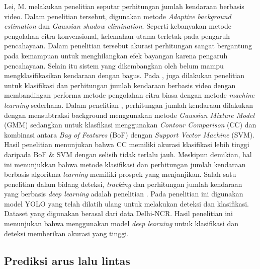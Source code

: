 \documentclass[conference]{IEEEtran}
\begin{document}
Lei, M. melakukan penelitian seputar perhitungan jumlah kendaraan berbasis video. Dalam penelitian tersebut, digunakan metode \textit{Adaptive background estimation} dan \textit{Gaussian shadow elimination}. Seperti kebanyakan metode pengolahan citra konvensional, kelemahan utama terletak pada pengaruh pencahayaan. Dalam penelitian tersebut akurasi perhitungan
sangat bergantung pada kemampuan untuk menghilangkan efek bayangan karena pengaruh pencahayaan. Selain itu sistem yang dikembangkan oleh \cite{Lei2018VehicleCounting} belum mampu mengklasifikasikan kendaraan dengan bagus.
Pada \cite{Sheeraz2018VehicleDetection}, juga dilakukan penelitian untuk klasifikasi dan perhitungan jumlah kendaraan berbasis video dengan membandingan performa metode pengolahan citra biasa dengan metode \textit{machine learning} sederhana. Dalam penelitian \cite{Sheeraz2018VehicleDetection}, perhitungan jumlah kendaraan dilakukan dengan mensubtraksi background menggunakan metode \textit{Gaussian Mixture Model} (GMM) sedangkan untuk klasfikasi menggunakan \textit{Contour Comparison} (CC) dan kombinasi antara \textit{Bag of Features}
(BoF) dengan \textit{Support Vector Machine} (SVM). Hasil penelitian menunjukan bahwa CC memiliki akurasi klasifikasi lebih tinggi daripada BoF \& SVM dengan selisih tidak terlalu jauh. 
Meskipun demikian, hal ini menunjukkan bahwa metode klasifikasi dan perhitungan jumlah kendaraan berbasis algoritma \textit{learning} memiliki prospek yang menjanjikan.
Salah satu penelitian dalam bidang deteksi, \textit{tracking} dan perhitungan jumlah kendaraan yang berbasis \textit{deep learning} adalah penelitian \cite{Chaucan2019CNN}. Pada penelitian ini digunakan model YOLO yang telah dilatih ulang untuk melakukan deteksi dan klasifikasi. Dataset yang digunakan berasal dari data Delhi-NCR. Hasil penelitian ini menunjukan bahwa menggunakan model \textit{deep learning} untuk klasifikasi dan deteksi memberikan akurasi yang tinggi.

\subsection{Prediksi arus lalu lintas}
\end{document}
